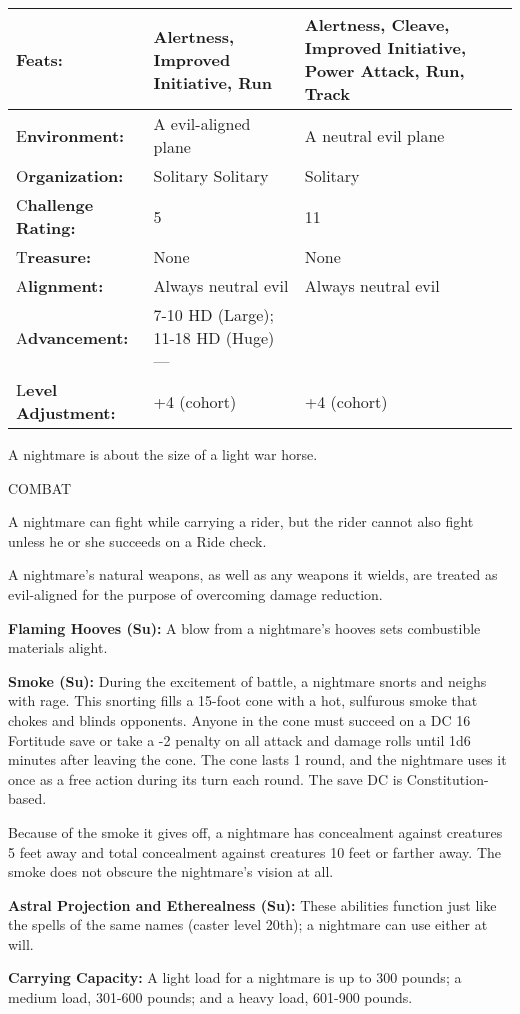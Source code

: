 \documentclass{article}
\begin{document}
\begin{tabular}{|>{\raggedright}p{47pt}|>{\raggedright}p{130pt}|>{\raggedright}p{136pt}|}
\hline
F\textbf{eats:} & Alertness, Improved Initiative, Run & Alertness, Cleave, Improved 
Initiative, Power Attack, Run, Track\tabularnewline
\hline
E\textbf{nvironment:} & A evil-aligned plane & A neutral evil plane\tabularnewline
\hline
O\textbf{rganization:} & Solitary Solitary & Solitary\tabularnewline
\hline
C{\small{}\textbf{hallenge Rating:}} & 5 & 11\tabularnewline
\hline
T\textbf{reasure:} & None & None\tabularnewline
\hline
A\textbf{lignment:} & Always neutral evil & Always neutral evil\tabularnewline
\hline
A\textbf{dvancement:} & 7-10 HD (Large); 11-18 HD (Huge)--- & \tabularnewline
\hline
L\textbf{evel Adjustment:} & +4 (cohort) & +4 (cohort)\tabularnewline
\hline
\end{tabular}

\vspace{12pt}
A nightmare is about the size of a light war horse.

COMBAT

A nightmare can fight while carrying a rider, but the rider cannot also fight unless 
he or she succeeds on a Ride check.

A nightmare's natural weapons, as well as any weapons it wields, are treated as 
evil-aligned for the purpose of overcoming damage reduction.

\textbf{Flaming Hooves (Su):} A blow from a nightmare's hooves sets combustible 
materials alight.

\textbf{Smoke (Su):} During the excitement of battle, a nightmare snorts and neighs 
with rage. This snorting fills a 15-foot cone with a hot, sulfurous smoke that 
chokes and blinds opponents. Anyone in the cone must succeed on a DC 16 Fortitude 
save or take a -2 penalty on all attack and damage rolls until 1d6 minutes after 
leaving the cone. The cone lasts 1 round, and the nightmare uses it once as a free 
action during its turn each round. The save DC is Constitution-based.

Because of the smoke it gives off, a nightmare has concealment against creatures 
5 feet away and total concealment against creatures 10 feet or farther away. The 
smoke does not obscure the nightmare's vision at all.

\textbf{Astral Projection and Etherealness (Su):} These abilities function just 
like the spells of the same names (caster level 20th); a nightmare can use either 
at will.

\textbf{Carrying Capacity: }A light load for a nightmare is up to 300 pounds; a 
medium load, 301-600 pounds; and a heavy load, 601-900 pounds.
\end{document}
